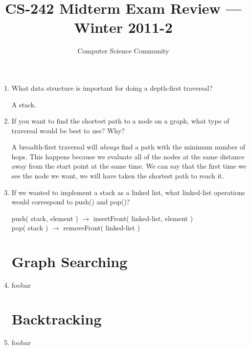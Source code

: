 \documentclass[11pt]{article}
\author{Computer Science Community}
\title{CS-242 Midterm Exam Review \---- Winter 2011-2}
\newenvironment{answer}{\large\lstset{basicstyle=\large}\color{white}}{}
\newenvironment{answer}{\large\lstset{basicstyle=\large}}{}
\begin{document}

\begin{enumerate}
\section*{Stacks and Queues}
    \item What data structure is important for doing a depth-ﬁrst traversal?

        \begin{answer}
        A stack.
        \end{answer}

    \item If you want to ﬁnd the shortest path to a node on a graph, what type
        of traversal would be best to use? Why?

        \begin{answer}
        A breadth-first traversal will {\em always} find a path with the
        minimum number of hops. This happens because we evaluate all of the
        nodes at the same distance away from the start point at the same time.
        We can say that the first time we see the node we want, we will have
        taken the shortest path to reach it.
        \end{answer}

    \item If we wanted to implement a stack as a linked list, what linked-list
        operations would correspond to push() and pop()?

        \begin{answer}
        push( stack, element ) $\rightarrow$ insertFront( linked-list, element )\\
        pop( stack ) $\rightarrow$ removeFront( linked-list )
        \end{answer}

\section*{Graph Searching}
    \item foobar
\section*{Backtracking}
    \item foobar
   
\end{enumerate}
\end{document}

